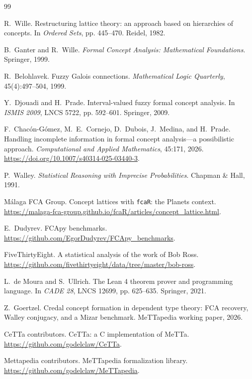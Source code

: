\documentclass[11pt]{article}
\begin{document}
\begin{thebibliography}{99}

R.~Wille.
\newblock Restructuring lattice theory: an approach based on hierarchies of concepts.
\newblock In \emph{Ordered Sets}, pp. 445--470. Reidel, 1982.

B.~Ganter and R.~Wille.
\newblock \emph{Formal Concept Analysis: Mathematical Foundations}.
\newblock Springer, 1999.

R.~Belohlavek.
\newblock Fuzzy Galois connections.
\newblock \emph{Mathematical Logic Quarterly}, 45(4):497--504, 1999.

Y.~Djouadi and H.~Prade.
\newblock Interval-valued fuzzy formal concept analysis.
\newblock In \emph{ISMIS 2009}, LNCS 5722, pp. 592--601. Springer, 2009.

F.~Chac\'on-G\'omez, M.~E.~Cornejo, D.~Dubois, J.~Medina, and H.~Prade.
\newblock Handling incomplete information in formal concept analysis---a
possibilistic approach.
\newblock \emph{Computational and Applied Mathematics}, 45:171, 2026.
\newblock \url{https://doi.org/10.1007/s40314-025-03440-3}.

P.~Walley.
\newblock \emph{Statistical Reasoning with Imprecise Probabilities}.
\newblock Chapman \& Hall, 1991.

M\'alaga FCA Group.
\newblock Concept lattices with \texttt{fcaR}: the Planets context.
\newblock \url{https://malaga-fca-group.github.io/fcaR/articles/concept_lattice.html}.

E.~Dudyrev.
\newblock FCApy benchmarks.
\newblock \url{https://github.com/EgorDudyrev/FCApy_benchmarks}.

FiveThirtyEight.
\newblock A statistical analysis of the work of Bob Ross.
\newblock \url{https://github.com/fivethirtyeight/data/tree/master/bob-ross}.

L.~de Moura and S.~Ullrich.
\newblock The Lean 4 theorem prover and programming language.
\newblock In \emph{CADE 28}, LNCS 12699, pp. 625--635. Springer, 2021.

Z.~Goertzel.
\newblock Credal concept formation in dependent type theory:
FCA recovery, Walley conjugacy, and a Mizar benchmark.
\newblock MeTTapedia working paper, 2026.

CeTTa contributors.
\newblock CeTTa: a C implementation of MeTTa.
\newblock \url{https://github.com/godelclaw/CeTTa}.

Mettapedia contributors.
\newblock MeTTapedia formalization library.
\newblock \url{https://github.com/godelclaw/MeTTapedia}.

\end{thebibliography}
\end{document}
